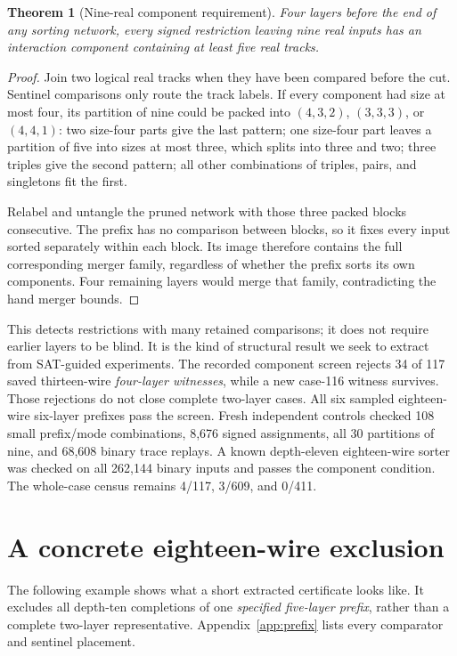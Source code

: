 \documentclass[11pt]{article}
\newtheorem{theorem}{Theorem}[section]
\begin{document}
\begin{theorem}[Nine-real component requirement]
Four layers before the end of any sorting network, every signed restriction leaving nine real inputs has an interaction component containing at least five real tracks.
\end{theorem}
\begin{proof}
Join two logical real tracks when they have been compared before the cut. Sentinel comparisons only route the track labels. If every component had size at most four, its partition of nine could be packed into $(4,3,2)$, $(3,3,3)$, or $(4,4,1)$: two size-four parts give the last pattern; one size-four part leaves a partition of five into sizes at most three, which splits into three and two; three triples give the second pattern; all other combinations of triples, pairs, and singletons fit the first.

Relabel and untangle the pruned network with those three packed blocks consecutive. The prefix has no comparison between blocks, so it fixes every input sorted separately within each block. Its image therefore contains the full corresponding merger family, regardless of whether the prefix sorts its own components. Four remaining layers would merge that family, contradicting the hand merger bounds.
\end{proof}
This detects restrictions with many retained comparisons; it does not require earlier layers to be blind. It is the kind of structural result we seek to extract from SAT-guided experiments. The recorded component screen rejects 34 of 117 saved thirteen-wire \emph{four-layer witnesses}, while a new case-116 witness survives. Those rejections do not close complete two-layer cases. All six sampled eighteen-wire six-layer prefixes pass the screen. Fresh independent controls checked 108 small prefix/mode combinations, 8,676 signed assignments, all 30 partitions of nine, and 68,608 binary trace replays. A known depth-eleven eighteen-wire sorter was checked on all 262,144 binary inputs and passes the component condition. The whole-case census remains 4/117, 3/609, and 0/411.

\section{A concrete eighteen-wire exclusion}\label{sec:example}
The following example shows what a short extracted certificate looks like. It excludes all depth-ten completions of one \emph{specified five-layer prefix}, rather than a complete two-layer representative. Appendix~\ref{app:prefix} lists every comparator and sentinel placement.
\end{document}
